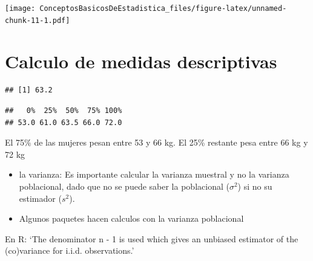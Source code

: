 \documentclass[twocolumn]{article}
\newenvironment{Shaded}{\begin{snugshade}}{\end{snugshade}}
\newcommand{\KeywordTok}[1]{\textcolor[rgb]{0.13,0.29,0.53}{\textbf{#1}}}
\newcommand{\OperatorTok}[1]{\textcolor[rgb]{0.81,0.36,0.00}{\textbf{#1}}}
\newcommand{\NormalTok}[1]{#1}
\begin{document}
\texttt{[image: ConceptosBasicosDeEstadistica\_files/figure-latex/unnamed-chunk-11-1.pdf]}

\section{Calculo de medidas
descriptivas}\label{calculo-de-medidas-descriptivas}

\begin{Shaded}
\end{Shaded}

\begin{verbatim}
## [1] 63.2
\end{verbatim}

\begin{Shaded}
\end{Shaded}

\begin{verbatim}
##   0%  25%  50%  75% 100% 
## 53.0 61.0 63.5 66.0 72.0
\end{verbatim}

El 75\% de las mujeres pesan entre 53 y 66 kg. El 25\% restante pesa
entre 66 kg y 72 kg

\begin{itemize}
\item
  la varianza: Es importante calcular la varianza muestral y no la
  varianza poblacional, dado que no se puede saber la poblacional
  (\(\sigma^2\)) si no su estimador (\(s^2\)).
\item
  Algunos paquetes hacen calculos con la varianza poblacional
\end{itemize}

En R: `The denominator n - 1 is used which gives an unbiased estimator
of the (co)variance for i.i.d. observations.'

\begin{Shaded}
\end{Shaded}
\end{document}
